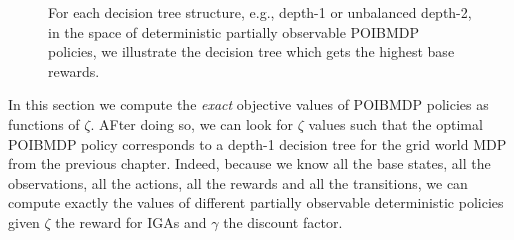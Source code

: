 \begin{figure}[htbp]
    \caption{For each decision tree structure, e.g., depth-1 or unbalanced depth-2, in the space of deterministic partially observable POIBMDP policies, we illustrate the decision tree which gets the highest base rewards.}
    \label{fig:optimal-policy-trees}
\end{figure}

In this section we compute the \textit{exact} objective values of POIBMDP policies as functions of $\zeta$. AFter doing so, we can look for $\zeta$ values such that the optimal POIBMDP policy corresponds to a depth-1 decision tree for the grid world MDP from the previous chapter.  
Indeed, because we know all the base states, all the observations, all the actions, all the rewards and all the transitions, we can compute exactly the values of different partially observable deterministic policies given $\zeta$ the reward for IGAs and $\gamma$ the discount factor.


